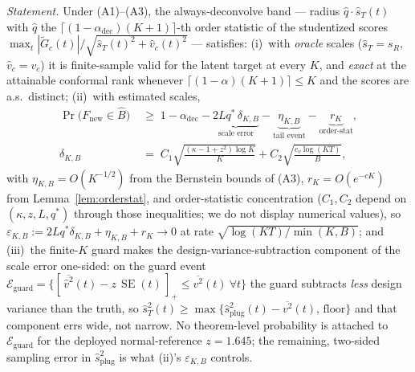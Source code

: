 \documentclass[12pt]{article}
\theoremstyle{definition}
\theoremstyle{remark}
\newcommand{\Gtilde}{\widetilde{G}}
\DeclareMathOperator{\SE}{SE}
\begin{document}
\emph{Statement.} Under (A1)--(A3), the always-deconvolve band --- radius
$\widehat q\cdot\widehat s_T(t)$ with $\widehat q$ the
$\lceil(1-\alpha_{\text{dec}})(K{+}1)\rceil$-th order statistic of the studentized
scores $\max_t|\Gtilde_c(t)|/\sqrt{\widehat s_T(t)^2+\widehat v_c(t)^2}$ ---
satisfies: (i)~with \emph{oracle} scales ($\widehat s_T=s_R$, $\widehat v_c=v_c$) it is
finite-sample valid for the latent target at every $K$, and \emph{exact} at the
attainable conformal rank whenever $\lceil(1-\alpha)(K{+}1)\rceil\le K$ and the
scores are a.s.\ distinct; (ii)~with estimated
scales,
\begin{align*}
\Pr\big(F_{\text{new}}\in\widehat B\big)\;&\ge\;1-\alpha_{\text{dec}}
-\underbrace{2Lq^*\,\delta_{K,B}}_{\text{scale error}}
-\underbrace{\eta_{K,B}}_{\text{tail event}}
-\underbrace{r_K}_{\text{order-stat}},\\[2pt]
\delta_{K,B}\;&=\;C_1\sqrt{\tfrac{(\kappa-1+z^2)\log K}{K}}
+C_2\sqrt{\tfrac{c_v\log(KT)}{B}},
\end{align*}
with $\eta_{K,B}=O(K^{-1/2})$ from the Bernstein bounds of (A3),
$r_K=O(e^{-cK})$ from Lemma~\ref{lem:orderstat}, and
order-statistic concentration ($C_1,C_2$ depend on $(\kappa,z,L,q^*)$ through those
inequalities; we do not display numerical values), so
$\varepsilon_{K,B}:=2Lq^*\delta_{K,B}+\eta_{K,B}+r_K\to0$ at rate
$\sqrt{\log(KT)/\min(K,B)}$; and (iii)~the finite-$K$ guard makes the
design-variance-subtraction component of the scale error one-sided: on the
guard event $\mathcal E_{\text{guard}}=\{[\,\overline{\widehat v^2}(t)-z\,\SE(t)\,]_+
\le\overline{v^2}(t)\ \forall t\}$ the guard subtracts \emph{less} design
variance than the truth, so
$\widehat s_T^2(t)\ge\max\{\widehat s_{\text{plug}}^2(t)-\overline{v^2}(t),\,\text{floor}\}$
and that component errs wide, not narrow. No theorem-level probability is
attached to $\mathcal E_{\text{guard}}$ for the deployed normal-reference
$z=1.645$; the remaining, two-sided sampling error in $\widehat s_{\text{plug}}^2$
is what (ii)'s $\varepsilon_{K,B}$ controls.
\end{document}
